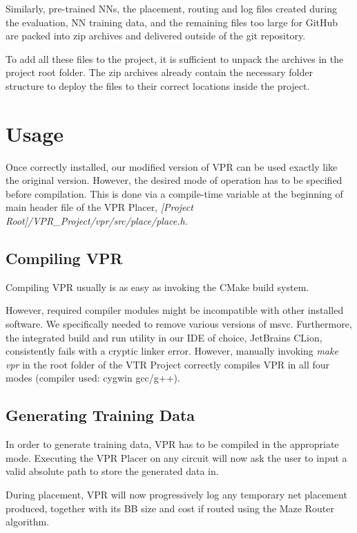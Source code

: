 Similarly, pre-trained \glspl{NN}, the placement, routing and log files created during the evaluation, \gls{NN} training data, and the remaining files too large for GitHub are packed into zip archives and delivered outside of the git repository.

To add all these files to the project, it is sufficient to unpack the archives in the project root folder. The zip archives already contain the necessary folder structure to deploy the files to their correct locations inside the project.

\section{Usage}

Once correctly installed, our modified version of \gls{VPR} can be used exactly like the original version. However, the desired mode of operation has to be specified before compilation. This is done via a compile-time variable at the beginning of main header file of the \gls{VPR} Placer, \textit{[Project Root]/VPR\_Project/vpr/src/place/place.h}.

\subsection{Compiling \gls{VPR}}

Compiling \gls{VPR} usually is as easy as invoking the CMake build system. 

However, required compiler modules might be incompatible with other installed software. We specifically needed to remove various versions of \gls{msvc}. Furthermore, the integrated build and run utility in our IDE of choice, JetBrains CLion, consistently fails with a cryptic linker error. However, manually invoking \textit{make vpr} in the root folder of the \gls{VTR} Project correctly compiles \gls{VPR} in all four modes (compiler used: cygwin gcc/g++).

\subsection{Generating Training Data}

In order to generate training data, \gls{VPR} has to be compiled in the appropriate mode. Executing the \gls{VPR} Placer on any circuit will now ask the user to input a valid absolute path to store the generated data in.

During placement, \gls{VPR} will now progressively log any temporary net placement produced, together with its \gls{BB} size and cost if routed using the Maze Router algorithm.

